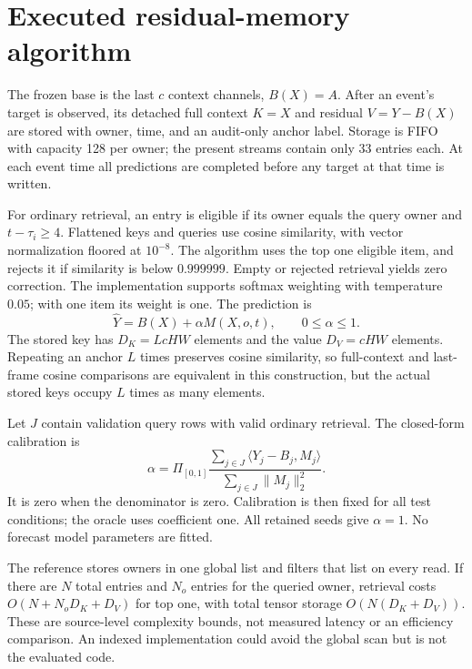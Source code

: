 \documentclass[11pt]{article}
\begin{document}
\section{Executed residual-memory algorithm}
The frozen base is the last $c$ context channels, $B(X)=A$. After an event's
target is observed, its detached full context $K=X$ and residual $V=Y-B(X)$
are stored with owner, time, and an audit-only anchor label. Storage is FIFO
with capacity 128 per owner; the present streams contain only 33 entries each.
At each event time all predictions are completed before any target at that
time is written.

For ordinary retrieval, an entry is eligible if its owner equals the query
owner and $t-\tau_i\ge4$. Flattened keys and queries use cosine similarity,
with vector normalization floored at $10^{-8}$. The algorithm uses the top
one eligible item, and rejects it if similarity is below $0.999999$. Empty or
rejected retrieval yields zero correction. The implementation supports
softmax weighting with temperature $0.05$; with one item its weight is one.
The prediction is
\begin{equation}
 \widehat Y=B(X)+\alpha M(X,o,t),\qquad 0\le\alpha\le1.
\end{equation}
The stored key has $D_K=LcHW$ elements and the value $D_V=cHW$ elements.
Repeating an anchor $L$ times preserves cosine similarity, so full-context
and last-frame cosine comparisons are equivalent in this construction, but
the actual stored keys occupy $L$ times as many elements.

Let $J$ contain validation query rows with valid ordinary retrieval. The
closed-form calibration is
\begin{equation}
 \alpha=\Pi_{[0,1]}
 \frac{\sum_{j\in J}\langle Y_j-B_j,M_j\rangle}
      {\sum_{j\in J}\|M_j\|_2^2}.
\end{equation}
It is zero when the denominator is zero. Calibration is then fixed for all
test conditions; the oracle uses coefficient one. All retained seeds give
$\alpha=1$. No forecast model parameters are fitted.

The reference stores owners in one global list and filters that list on every
read. If there are $N$ total entries and $N_o$ entries for the queried owner,
retrieval costs $O(N+N_oD_K+D_V)$ for top one, with total tensor storage
$O(N(D_K+D_V))$. These are source-level complexity bounds, not measured
latency or an efficiency comparison. An indexed implementation could avoid the
global scan but is not the evaluated code.
\end{document}
